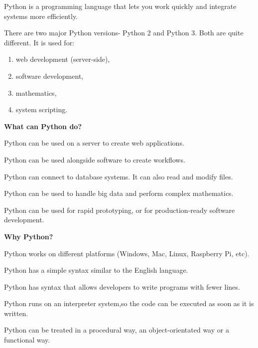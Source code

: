 \documentclass[a4paper, 12pt]{report}
\begin{document}
Python is a programming language that lets you work quickly and integrate systems more efficiently.

There are two major Python versions- Python 2 and Python 3. Both are quite different.
It is used for:
\begin{enumerate}

\item
web development (server-side),
\item
software development,
\item
mathematics,
\item
system scripting.
\end{enumerate}
\textbf{What can Python do?}
\begin{description}[font=$\bullet$]
\item
Python can be used on a server to create web  applications.
\item
Python can be used alongside software to create workflows.
\item
Python can connect to database systems. It can also read and modify files.
\item
Python can be used to handle big data and perform complex mathematics.
\item
Python can be used for rapid prototyping, or for production-ready software development.
\end{description}
\textbf{Why Python?}
\begin{description}[font=$\bullet$]
\item
Python works on different platforms (Windows, Mac, Linux, Raspberry Pi, etc).
\item
Python has a simple syntax similar to the English language.
\item
Python has syntax that allows developers to write programs with fewer lines.
\item
Python runs on an interpreter system,so the code can be executed as soon as it is written.
\item
Python can be treated in a procedural way, an object-orientated way or a functional way.
\end{description}
\end{document}
